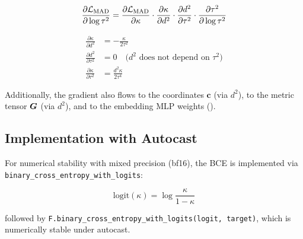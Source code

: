 \begin{equation}
    \frac{\partial \mathcal{L}_{\text{MAD}}}{\partial \log \tau^2} =
    \frac{\partial \mathcal{L}_{\text{MAD}}}{\partial \kappa} \cdot
    \frac{\partial \kappa}{\partial d^2} \cdot
    \frac{\partial d^2}{\partial \tau^2} \cdot
    \frac{\partial \tau^2}{\partial \log \tau^2}
\end{equation}

\begin{align}
    \frac{\partial \kappa}{\partial d^2} &= -\frac{\kappa}{2\tau^2} \\
    \frac{\partial d^2}{\partial \tau^2} &= 0 \quad \text{($d^2$ does not depend on $\tau^2$)} \\
    \frac{\partial \kappa}{\partial \tau^2} &= \frac{d^2 \kappa}{2\tau^4}
\end{align}

Additionally, the gradient also flows to the coordinates $\bm{c}$
(via $d^2$), to the metric tensor $\bm{G}$ (via $d^2$), and to the
embedding MLP weights ().

\subsection{Implementation with Autocast}

For numerical stability with mixed precision (bf16), the BCE is
implemented via \texttt{binary\_cross\_entropy\_with\_logits}:

\begin{equation}
    \text{logit}(\kappa) = \log\frac{\kappa}{1 - \kappa}
\end{equation}

followed by \texttt{F.binary\_cross\_entropy\_with\_logits(logit, target)},
which is numerically stable under autocast.

